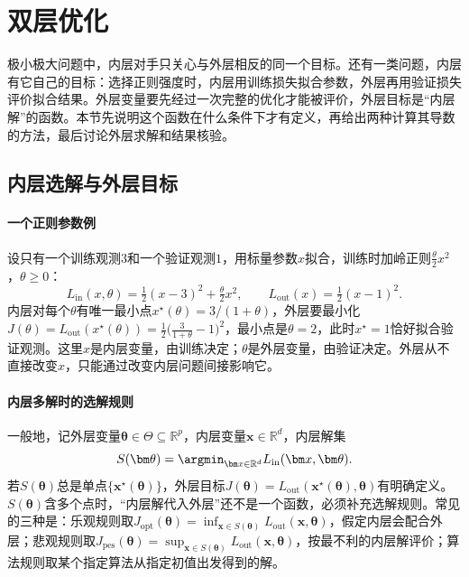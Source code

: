 \section{双层优化}
\label{sec:opt-mmb-bilevel}

极小极大问题中，内层对手只关心与外层相反的同一个目标。还有一类问题，内层有它自己的目标：选择正则强度时，内层用训练损失拟合参数，外层再用验证损失评价拟合结果。外层变量要先经过一次完整的优化才能被评价，外层目标是“内层解”的函数。本节先说明这个函数在什么条件下才有定义，再给出两种计算其导数的方法，最后讨论外层求解和结果核验。

\subsection{内层选解与外层目标}
\label{sec:opt-mmb-bilevel-selection}

\paragraph{一个正则参数例}
设只有一个训练观测$3$和一个验证观测$1$，用标量参数$x$拟合，训练时加岭正则$\frac\theta2x^2$，$\theta\geq0$：
\begin{equation}
\label{eq:opt-mmb-ridge-bilevel}
L_{\mathrm{in}}(x,\theta)=\tfrac12(x-3)^2+\tfrac\theta2x^2,\qquad
L_{\mathrm{out}}(x)=\tfrac12(x-1)^2.
\end{equation}
内层对每个$\theta$有唯一最小点$x^\star(\theta)=3/(1+\theta)$，外层要最小化$J(\theta)=L_{\mathrm{out}}(x^\star(\theta))=\frac12\bigl(\frac3{1+\theta}-1\bigr)^2$，最小点是$\theta=2$，此时$x^\star=1$恰好拟合验证观测。这里$x$是内层变量，由训练决定；$\theta$是外层变量，由验证决定。外层从不直接改变$x$，只能通过改变内层问题间接影响它。

\paragraph{内层多解时的选解规则}
一般地，记外层变量$\bm\theta\in\Theta\subseteq\mathbb R^p$，内层变量$\bm x\in\mathbb R^d$，内层解集
\[
S(\bm\theta)=\argmin_{\bm x\in\mathbb R^d}L_{\mathrm{in}}(\bm x,\bm\theta).
\]
若$S(\bm\theta)$总是单点$\{\bm x^\star(\bm\theta)\}$，外层目标$J(\bm\theta)=L_{\mathrm{out}}(\bm x^\star(\bm\theta),\bm\theta)$有明确定义。$S(\bm\theta)$含多个点时，“内层解代入外层”还不是一个函数，必须补充选解规则。常见的三种是：乐观规则取$J_{\mathrm{opt}}(\bm\theta)=\inf_{\bm x\in S(\bm\theta)}L_{\mathrm{out}}(\bm x,\bm\theta)$，假定内层会配合外层；悲观规则取$J_{\mathrm{pes}}(\bm\theta)=\sup_{\bm x\in S(\bm\theta)}L_{\mathrm{out}}(\bm x,\bm\theta)$，按最不利的内层解评价；算法规则取某个指定算法从指定初值出发得到的解。

